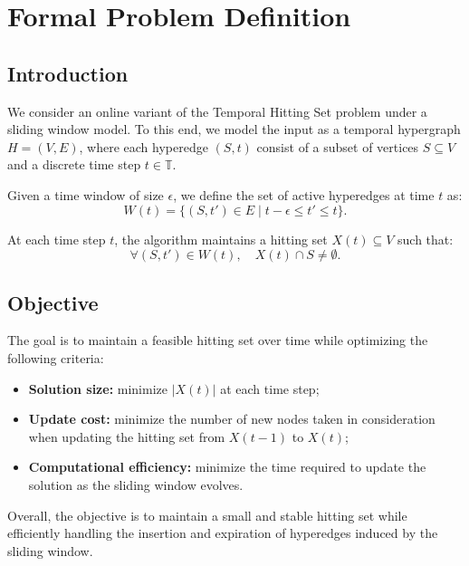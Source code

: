 \section{Formal Problem Definition}

\subsection{Introduction}

We consider an online variant of the Temporal Hitting Set problem under a sliding window model. 
To this end, we model the input as a temporal hypergraph $H = (V, E)$, where each hyperedge $(S, t)$ consist of a subset of vertices $S \subseteq V$ and a discrete time step $t \in \mathbb{T}$.

Given a time window of size $\epsilon$, we define the set of active hyperedges at time $t$ as:
\[
W(t) = \{ (S, t') \in E \mid t - \epsilon \le t' \le t \}.
\]

At each time step $t$, the algorithm maintains a hitting set $X(t) \subseteq V$ such that:
\[
\forall (S, t') \in W(t), \quad X(t) \cap S \neq \emptyset.
\]

\subsection{Objective}

The goal is to maintain a feasible hitting set over time while optimizing the following criteria:

\begin{itemize}
    \item \textbf{Solution size:} minimize $|X(t)|$ at each time step;
    \item \textbf{Update cost:} minimize the number of new nodes taken in consideration when updating the hitting set from $X(t-1)$ to $X(t)$;
    \item \textbf{Computational efficiency:} minimize the time required to update the solution as the sliding window evolves.
\end{itemize}

Overall, the objective is to maintain a small and stable hitting set while efficiently handling the insertion and expiration of hyperedges induced by the sliding window.